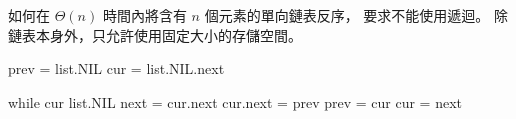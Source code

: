 \startEXERCISE
如何在 $\Theta(n)$ 時間內將含有 $n$ 個元素的單向鏈表反序，
要求不能使用遞迴。
除鏈表本身外，只允許使用固定大小的存儲空間。
\stopEXERCISE

\startANSWER
{}
\startCLRSCODE
prev = list.NIL
cur = list.NIL.next

while cur \ne list.NIL
	next = cur.next
	cur.next = prev
	prev = cur
	cur = next
\stopCLRSCODE
\stopANSWER

